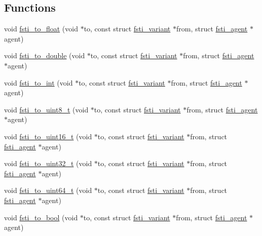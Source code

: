 \subsection*{Functions}
\begin{DoxyCompactItemize}
\item 
void \mbox{\hyperlink{fsti-events_8c_af4a768af0f5d827f7b40da95c29879da}{fsti\+\_\+to\+\_\+float}} (void $\ast$to, const struct \mbox{\hyperlink{structfsti__variant}{fsti\+\_\+variant}} $\ast$from, struct \mbox{\hyperlink{structfsti__agent}{fsti\+\_\+agent}} $\ast$agent)
\item 
void \mbox{\hyperlink{fsti-events_8c_a89b0fd0e286b354aa15c5e5bbfc50bcb}{fsti\+\_\+to\+\_\+double}} (void $\ast$to, const struct \mbox{\hyperlink{structfsti__variant}{fsti\+\_\+variant}} $\ast$from, struct \mbox{\hyperlink{structfsti__agent}{fsti\+\_\+agent}} $\ast$agent)
\item 
void \mbox{\hyperlink{fsti-events_8c_ae5bb2a1c874126eca3ed12115e22360a}{fsti\+\_\+to\+\_\+int}} (void $\ast$to, const struct \mbox{\hyperlink{structfsti__variant}{fsti\+\_\+variant}} $\ast$from, struct \mbox{\hyperlink{structfsti__agent}{fsti\+\_\+agent}} $\ast$agent)
\item 
void \mbox{\hyperlink{fsti-events_8c_ae35be4fced1f9a93476a536b20332478}{fsti\+\_\+to\+\_\+uint8\+\_\+t}} (void $\ast$to, const struct \mbox{\hyperlink{structfsti__variant}{fsti\+\_\+variant}} $\ast$from, struct \mbox{\hyperlink{structfsti__agent}{fsti\+\_\+agent}} $\ast$agent)
\item 
void \mbox{\hyperlink{fsti-events_8c_ae8b4ae93bd4e79aa79a65582fd20b612}{fsti\+\_\+to\+\_\+uint16\+\_\+t}} (void $\ast$to, const struct \mbox{\hyperlink{structfsti__variant}{fsti\+\_\+variant}} $\ast$from, struct \mbox{\hyperlink{structfsti__agent}{fsti\+\_\+agent}} $\ast$agent)
\item 
void \mbox{\hyperlink{fsti-events_8c_aeb78cf09418931e6fb729435a33a9b7f}{fsti\+\_\+to\+\_\+uint32\+\_\+t}} (void $\ast$to, const struct \mbox{\hyperlink{structfsti__variant}{fsti\+\_\+variant}} $\ast$from, struct \mbox{\hyperlink{structfsti__agent}{fsti\+\_\+agent}} $\ast$agent)
\item 
void \mbox{\hyperlink{fsti-events_8c_a964cff2ca16ac067e90708b2f04f7098}{fsti\+\_\+to\+\_\+uint64\+\_\+t}} (void $\ast$to, const struct \mbox{\hyperlink{structfsti__variant}{fsti\+\_\+variant}} $\ast$from, struct \mbox{\hyperlink{structfsti__agent}{fsti\+\_\+agent}} $\ast$agent)
\item 
void \mbox{\hyperlink{fsti-events_8c_a4e7751c7aa6ac604615cc3829150d828}{fsti\+\_\+to\+\_\+bool}} (void $\ast$to, const struct \mbox{\hyperlink{structfsti__variant}{fsti\+\_\+variant}} $\ast$from, struct \mbox{\hyperlink{structfsti__agent}{fsti\+\_\+agent}} $\ast$agent)

\end{DoxyCompactItemize}
